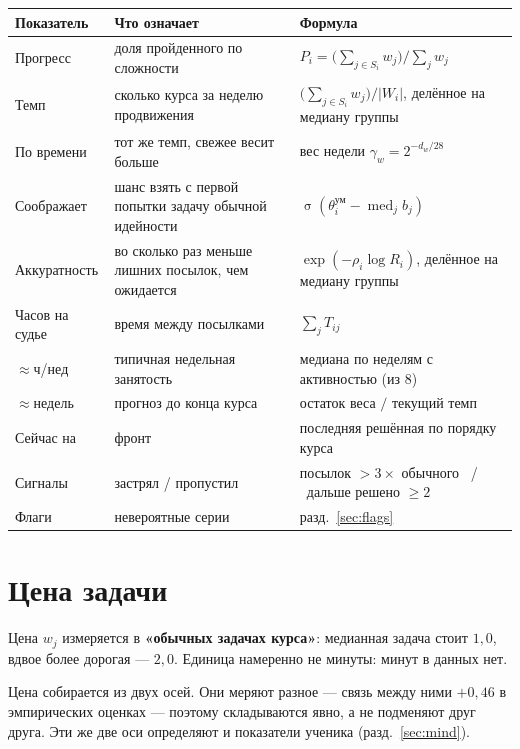 \documentclass[11pt,a4paper]{article}
\newcommand{\med}{\operatorname{med}}
\newcommand{\sig}{\operatorname{\sigma}}
\begin{document}
\begin{center}
\begin{tabular}{@{}lp{5.2cm}p{6.3cm}@{}}
\toprule
Показатель & Что означает & Формула \\
\midrule
Прогресс & доля пройденного по сложности &
  $P_i = \bigl(\sum_{j \in S_i} w_j\bigr) / \sum_j w_j$ \\[2.2ex]
Темп & сколько курса за неделю продвижения &
  $\bigl(\sum_{j \in S_i} w_j\bigr) / |W_i|$, делённое на медиану группы \\[2.2ex]
По времени & тот же темп, свежее весит больше &
  вес недели $\gamma_w = 2^{-d_w/28}$ \\[1.2ex]
Соображает & шанс взять с первой попытки задачу обычной идейности &
  $\sig(\theta^{\text{ум}}_i - \med_j b_j)$ \\[2.2ex]
Аккуратность & во сколько раз меньше лишних посылок, чем ожидается &
  $\exp(-\rho_i \log R_i)$, делённое на медиану группы \\[2.2ex]
Часов на судье & время между посылками &
  $\sum_j T_{ij}$ \\[1.2ex]
$\approx$ч/нед & типичная недельная занятость &
  медиана по неделям с активностью (из 8) \\[1.2ex]
$\approx$недель & прогноз до конца курса &
  остаток веса $/$ текущий темп \\[1.2ex]
Сейчас на & фронт & последняя решённая по порядку курса \\[1.2ex]
Сигналы & застрял / пропустил &
  посылок $> 3\times$ обычного \ / \ дальше решено $\geq 2$ \\[1.2ex]
Флаги & невероятные серии & разд.~\ref{sec:flags} \\
\bottomrule
\end{tabular}
\end{center}

\section{Цена задачи}

Цена $w_j$ измеряется в \textbf{«обычных задачах курса»}: медианная задача
стоит $1{,}0$, вдвое более дорогая --- $2{,}0$. Единица намеренно не минуты:
минут в данных нет.

Цена собирается из двух осей. Они меряют разное --- связь между ними $+0{,}46$
в эмпирических оценках --- поэтому складываются явно, а не подменяют друг друга.
Эти же две оси определяют и показатели ученика (разд.~\ref{sec:mind}).
\end{document}
